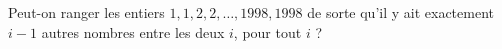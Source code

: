 Peut-on ranger les entiers $1, 1, 2, 2, \ldots, 1998, 1998$ de sorte qu'il y ait exactement $i - 1$ autres nombres entre les deux $i$, pour tout $i$ ?
